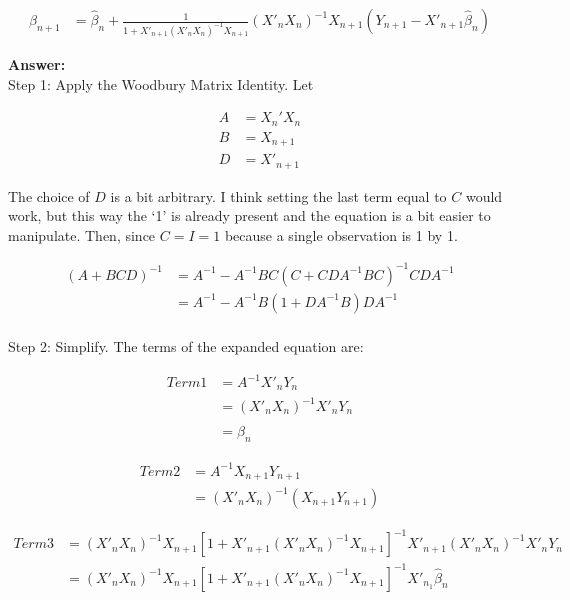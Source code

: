 \documentclass[14pt]{extreport}
\newcommand{\answer}[0]{\medskip \textbf{Answer:} \medskip \\}
\begin{document}
\begin{enumerate}
    \begin{align*}
        \widehat{\beta}_{n+1} &= \widehat{\beta}_n + \frac{1}{1 + X'_{n+1}(X'_n X_n)^{-1}X_{n+1}}
        (X'_{n} X_{n})^{-1}X_{n+1}(Y_{n+1} - X'_{n+1}\widehat{\beta}_n)
    \end{align*}

    \answer
    Step 1: Apply the Woodbury Matrix Identity. Let 

    \begin{align*}
        A &= X_n'X_n \\
        B &= X_{n+1} \\
        D &= X'_{n+1}
    \end{align*}

    The choice of \(D\) is a bit arbitrary. I think setting the last term equal to \(C\) would work,
    but this way the `1' is already present and the equation is a bit easier to manipulate.
    Then, since \(C = I = 1\) because a single observation is 1 by 1.

    \begin{align*}
        (A + BCD)^{-1} &= A^{-1} - A^{-1}BC\left(C + CDA^{-1}BC\right)^{-1}CDA^{-1} \\
        &= A^{-1} - A^{-1}B(1 + DA^{-1}B)DA^{-1} \\
    \end{align*}

    Step 2: Simplify. The terms of the expanded equation are:

    \begin{align*}
        Term1 &= A^{-1}X'_nY_n \\
        &= (X'_n X_n)^{-1}X'_nY_n \\
        &= \widehat{\beta}_n
    \end{align*}

    \begin{align*}
        Term2 &= A^{-1}X_{n+1}Y_{n+1} \\
        &= (X'_n X_n)^{-1}(X_{n+1} Y_{n+1})
    \end{align*}

    \begin{align*}
        Term3 &= (X'_n X_n)^{-1} X_{n+1} \left[1 + X'_{n+1}(X'_n X_n)^{-1}X_{n+1}\right]^{-1}
                 X'_{n+1}(X'_nX_n)^{-1}X'_nY_n \\
              &= (X'_n X_n)^{-1}X_{n+1}\left[1 + X'_{n+1}(X'_n X_n)^{-1}X_{n+1}\right]^{-1}
                 X'_{n_1} \widehat{\beta}_n
    \end{align*}


\end{enumerate}
\end{document}
